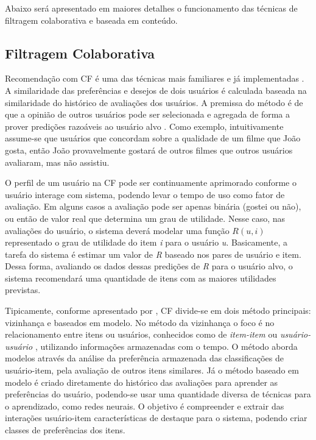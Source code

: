 Abaixo será apresentado em maiores detalhes o funcionamento das técnicas de filtragem colaborativa e baseada em conteúdo.

\subsection{Filtragem Colaborativa}

Recomendação com \ac{CF} é uma das técnicas mais familiares e já implementadas \citep{Ricci2011}. A similaridade das preferências e desejos de dois usuários é calculada baseada na similaridade do histórico de avaliações dos usuários. A premissa do método é de que a opinião de outros usuários pode ser selecionada e agregada de forma a prover predições razoáveis ao usuário alvo \citep{HCI-009}. Como exemplo, intuitivamente assume-se que usuários que concordam sobre a qualidade de um filme que João gosta, então João provavelmente gostará de outros filmes que outros usuários avaliaram, mas não assistiu.

O perfil de um usuário na CF pode ser continuamente aprimorado conforme o usuário interage com sistema, podendo levar o tempo de uso como fator de avaliação. Em alguns casos a avaliação pode ser apenas binária (gostei ou não), ou então de valor real que determina um grau de utilidade. Nesse caso, nas avaliações do usuário, o sistema deverá modelar uma função $R(u,i)$ representado o grau de utilidade do item \textit{i} para o usuário \textit{u}.  Basicamente, a tarefa do sistema é estimar um valor de \textit{R} baseado nos pares de usuário e item. Dessa forma, avaliando os dados dessas predições de \textit{R} para o usuário alvo, o sistema recomendará uma quantidade de itens com as maiores utilidades previstas.

Tipicamente, conforme apresentado por \cite{Burke:2002:HRS:586321.586352}, CF divide-se em dois método principais: vizinhança e baseados em modelo. No método da vizinhança o foco é no relacionamento entre itens ou usuários, conhecidos como de \textit{item-item} ou \textit{usuário-usuário} \citep{Ricci2011}, utilizando informações armazenadas com o tempo. O método aborda modelos através da análise da preferência armazenada das classificações de usuário-item, pela avaliação de outros itens similares. Já o método baseado em modelo é criado diretamente do histórico das avaliações para aprender as preferências do usuário, podendo-se usar uma quantidade diversa de técnicas para o aprendizado, como redes neurais. O objetivo é compreender e extrair das interações usuário-item características de destaque para o sistema, podendo criar classes de preferências dos itens.

